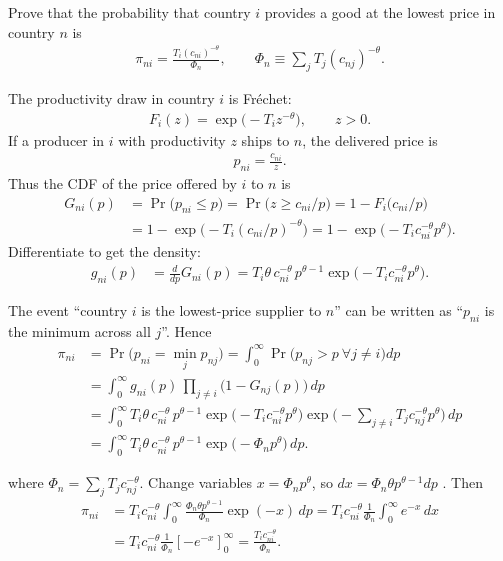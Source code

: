 Prove that the probability that country $i$ provides a good at the lowest price in country $n$ is
\begin{align*}
\pi_{ni} = \frac{T_i (c_{ni})^{-\theta}}{\Phi_n},
\qquad
\Phi_n \equiv \sum_j T_j (c_{nj})^{-\theta}.
\end{align*}

\begin{solution}
The productivity draw in country $i$ is Fr\'echet:
\begin{align*}
F_i(z) = \exp\big(-T_i z^{-\theta}\big), \qquad z>0.
\end{align*}
If a producer in $i$ with productivity $z$ ships to $n$, the delivered price is
\begin{align*}
p_{ni}=\frac{c_{ni}}{z}.
\end{align*}
Thus the CDF of the price offered by $i$ to $n$ is
\begin{align*}
G_{ni}(p)
&= \Pr\big(p_{ni}\le p\big)
= \Pr\big(z \ge c_{ni}/p\big)
= 1 - F_i\!\big(c_{ni}/p\big) \\
&= 1 - \exp\!\big(-T_i (c_{ni}/p)^{-\theta}\big)
= 1 - \exp\!\big(-T_i c_{ni}^{-\theta} p^{\theta}\big).
\end{align*}
Differentiate to get the density:
\begin{align*}
g_{ni}(p)
&= \frac{d}{dp}G_{ni}(p)
= T_i \theta\, c_{ni}^{-\theta}\, p^{\theta-1}
    \exp\!\big(-T_i c_{ni}^{-\theta} p^{\theta}\big).
\end{align*}

The event ``country $i$ is the lowest-price supplier to $n$'' can be written as
``$p_{ni}$ is the minimum across all $j$''. Hence
\begin{align*}
\pi_{ni}
&= \Pr\big(p_{ni} = \min_j p_{nj}\big)
= \int_0^\infty \Pr\big(p_{nj}>p\ \forall j\neq i\big) dp \\
&= \int_0^\infty g_{ni}(p)\, \prod_{j\neq i}\big(1-G_{nj}(p)\big)\, dp \\
&= \int_0^\infty T_i \theta\, c_{ni}^{-\theta}\, p^{\theta-1}
    \exp\!\big(-T_i c_{ni}^{-\theta} p^{\theta}\big)
    \exp\!\Big(-\sum_{j\neq i} T_j c_{nj}^{-\theta} p^{\theta}\Big)\, dp \\
&= \int_0^\infty T_i \theta\, c_{ni}^{-\theta}\, p^{\theta-1}
    \exp\!\big(-\Phi_n p^{\theta}\big)\, dp.
\end{align*}

where $\Phi_n = \sum_j T_j c_{nj}^{-\theta}$. Change variables $x=\Phi_n p^{\theta}$, so $dx = \Phi_n \theta p^{\theta-1} dp$ . Then
\begin{align*}
\pi_{ni}
&= T_i c_{ni}^{-\theta} \int_0^\infty \frac{\Phi_n \theta p^{\theta-1}}{\Phi_n}
    \exp(-x)\, dp
= T_i c_{ni}^{-\theta} \frac{1}{\Phi_n}\int_0^\infty e^{-x}\, dx \\
&= T_i c_{ni}^{-\theta} \frac{1}{\Phi_n} \left[-e^{-x}\right]_0^\infty
= \frac{T_i c_{ni}^{-\theta}}{\Phi_n}.
\end{align*}
\end{solution}
